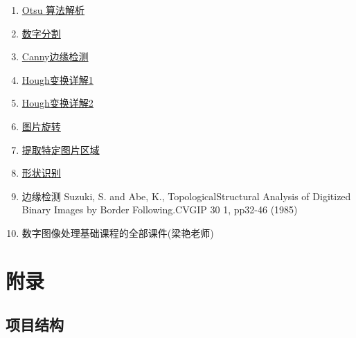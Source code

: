 \documentclass{ctexart}
\begin{document}
\begin{enumerate}
    \item \href{https://blog.csdn.net/a15779627836/article/details/124151125}{Otsu 算法解析}
    \item \href{https://www.cnblogs.com/skyfsm/p/8029668.html}{数字分割}
    \item \href{https://blog.csdn.net/weixin_42272768/article/details/111244896}{Canny边缘检测}
    \item \href{https://blog.csdn.net/qq_30460949/article/details/90293147}{Hough变换详解1}
    \item \href{https://blog.csdn.net/qq_41112170/article/details/125729100}{Hough变换详解2}
    \item \href{https://blog.csdn.net/wyx100/article/details/80541726}{图片旋转}
    \item \href{https://blog.csdn.net/weixin_47365088/article/details/116566822}{提取特定图片区域}
    \item \href{https://blog.csdn.net/LPYchengxuyuan/article/details/122003702?utm_medium=distribute.pc_relevant.none-task-blog-2~default~baidujs_baidulandingword~default-0-122003702-blog-124125975.pc_relevant_aa&spm=1001.2101.3001.4242.1&utm_relevant_index=3}{形状识别}
    \item 边缘检测 Suzuki, S. and Abe, K., TopologicalStructural Analysis of Digitized Binary Images by Border Following.CVGIP 30 1, pp32-46 (1985)
    \item 数字图像处理基础课程的全部课件(梁艳老师)
\end{enumerate}

\section{附录}
\subsection{项目结构}
\end{document}
